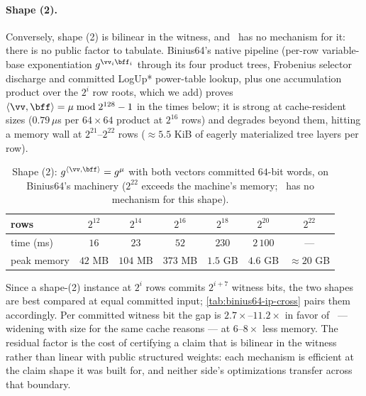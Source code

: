 \paragraph{Shape (2).} Conversely, shape (2) is bilinear in the witness, and \ftwoz\ has no mechanism for it: there is no public factor to tabulate. Binius64's native pipeline (per-row variable-base exponentiation $g^{\vv_i \bff_i}$ through its four product trees, Frobenius selector discharge and committed LogUp* power-table lookup, plus one accumulation product over the $2^i$ row roots, which we add) proves $\langle \vv,\bff\rangle = \mu \bmod 2^{128}-1$ in the times below; it is strong at cache-resident sizes ($0.79\,\mu$s per $64\times 64$ product at $2^{16}$ rows) and degrades beyond them, hitting a memory wall at $2^{21}$--$2^{22}$ rows ($\approx 5.5$ KiB of eagerly materialized tree layers per row).

\begin{table}[H]
\centering
\begin{tabular}{lcccccc}
\toprule
rows & $2^{12}$ & $2^{14}$ & $2^{16}$ & $2^{18}$ & $2^{20}$ & $2^{22}$ \\
\midrule
time (ms) & $16$ & $23$ & $52$ & $230$ & $2\,100$ & --- \\
peak memory & $42$ MB & $104$ MB & $373$ MB & $1.5$ GB & $4.6$ GB & $\approx 20$ GB \\
\bottomrule
\end{tabular}
\caption{Shape (2): $g^{\langle \vv,\bff\rangle}=g^{\mu}$ with both vectors committed $64$-bit words, on Binius64's machinery ($2^{22}$ exceeds the machine's memory; \ftwoz\ has no mechanism for this shape).}
\label{tab:binius64-ip-setting2}
\end{table}

Since a shape-(2) instance at $2^i$ rows commits $2^{i+7}$ witness bits, the two shapes are best compared at equal committed input; \cref{tab:binius64-ip-cross} pairs them accordingly. Per committed witness bit the gap is $2.7\times$--$11.2\times$ in favor of \ftwoz\ --- widening with size for the same cache reasons --- at $6$--$8\times$ less memory. The residual factor is the cost of certifying a claim that is bilinear in the witness rather than linear with public structured weights: each mechanism is efficient at the claim shape it was built for, and neither side's optimizations transfer across that boundary.

